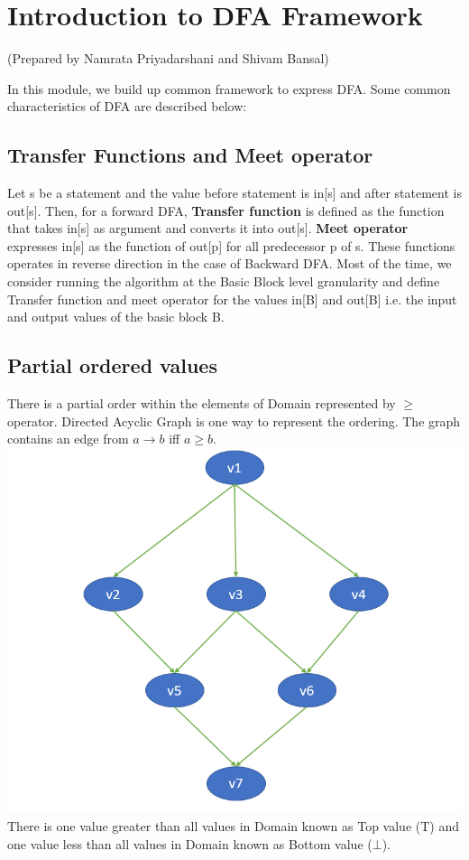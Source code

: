 \section {Introduction to DFA Framework}
\setlength{\parindent}{0pt}
(Prepared by Namrata Priyadarshani and Shivam Bansal)

\vspace{0.3cm}

In this module, we build up common framework to express DFA. Some common characteristics of DFA are described below: 

\subsection{Transfer Functions and Meet operator}

Let s be a statement and the value before statement is in[s] and after statement is out[s]. Then, for a forward DFA, \textbf{Transfer function} is defined as the function that takes in[s] as argument and converts it into out[s]. \textbf{Meet operator} expresses in[s] as the function of out[p] for all predecessor p of s. These functions operates in reverse direction in the case of Backward DFA.
\newline
Most of the time, we consider running the algorithm at the Basic Block level granularity and define Transfer function and meet operator for the values in[B] and out[B] i.e. the input and output values of the basic block B. 

\subsection{Partial ordered values}

There is a partial order within the elements of Domain represented by $\geq$ operator.
Directed Acyclic Graph is one way to represent the ordering. The graph contains an edge from $a \rightarrow b$ iff $a \geq b$.
\includegraphics[scale=0.3]{images/91_1.png}
There is one value greater than all values in Domain known as Top value (T) and one value less than all values in Domain known as Bottom value ($ \bot $).

